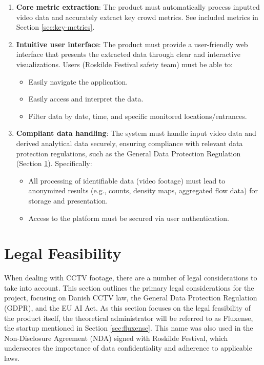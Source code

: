 \begin{enumerate}
  \item \textbf{Core metric extraction}: The product must automatically process inputted video data and accurately extract key crowd metrics. See included metrics in Section \ref{sec:key-metrics}.

  \item \textbf{Intuitive user interface}: The product must provide a user-friendly web interface that presents the extracted data through clear and interactive visualizations. Users (Roskilde Festival safety team) must be able to:
        \begin{itemize}
          \item Easily navigate the application.
          \item Easily access and interpret the data.
          \item Filter data by date, time, and specific monitored locations/entrances.
        \end{itemize}

  \item \textbf{Compliant data handling}: The system must handle input video data and derived analytical data securely, ensuring compliance with relevant data protection regulations, such as the General Data Protection Regulation (Section \ref{sec:legal-feasibility}). Specifically:
        \begin{itemize}
          \item All processing of identifiable data (video footage) must lead to anonymized results (e.g., counts, density maps, aggregated flow data) for storage and presentation.
          \item Access to the platform must be secured via user authentication.
        \end{itemize}
\end{enumerate}

\section{Legal Feasibility}
\label{sec:legal-feasibility}
When dealing with CCTV footage, there are a number of legal considerations to take into account. This section outlines the primary legal considerations for the project, focusing on Danish CCTV law, the General Data Protection Regulation (GDPR), and the EU AI Act. As this section focuses on the legal feasibility of the product itself, the theoretical administrator will be referred to as Fluxense, the startup mentioned in Section \ref{sec:fluxense}. This name was also used in the Non-Disclosure Agreement (NDA) signed with Roskilde Festival, which underscores the importance of data confidentiality and adherence to applicable laws.

